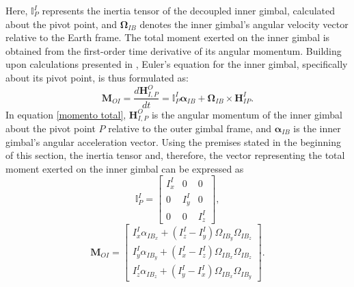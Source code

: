 Here, $\mathbb{I}^I_P$ represents the inertia tensor of the decoupled inner gimbal, calculated about the pivot point, and $\mathbf{\Omega}_{IB}$ denotes the inner gimbal's angular velocity vector relative to the Earth frame. The total moment exerted on the inner gimbal is obtained from the first-order time derivative of its angular momentum. Building upon calculations presented in , Euler's equation for the inner gimbal, specifically about its pivot point, is thus formulated as:
\begin{equation}
   \label{momento total}
   \mathbf{M}_{OI} = \frac{d\mathbf{H}^O_{I,P}}{dt} = \mathbb{I}^I_P \bm{\alpha}_{IB} + \mathbf{\Omega}_{IB} \times \mathbf{H}^I_{IP}.
\end{equation}
In equation \eqref{momento total}, $\mathbf{H}^O_{I,P}$ is the angular momentum of the inner gimbal about the pivot point $P$ relative to the outer gimbal frame, and $\bm{\alpha}_{IB}$ is the inner gimbal's angular acceleration vector. Using the premises stated in the beginning of this section, the inertia tensor and, therefore, the vector representing the total moment exerted on the inner gimbal can be expressed as
\begin{equation}
   \mathbb{I}^I_P = \left[ \begin{matrix}I^I_x & 0 & 0 \\ 0 & I^I_y & 0 \\ 0 & 0 & I^I_z\end{matrix}\right],
\end{equation}
\begin{equation}
   \mathbf{M}_{OI} = \left[ \begin{matrix}I^I_x \alpha_{IB_x} + (I^I_z - I^I_y) \Omega_{IB_y} \Omega_{IB_z} \\ I^I_y \alpha_{IB_y} + (I^I_x - I^I_z) \Omega_{IB_x} \Omega_{IB_z} \\ I^I_z \alpha_{IB_z} + (I^I_y - I^I_x) \Omega_{IB_x} \Omega_{IB_y}\end{matrix}\right].
\end{equation}

